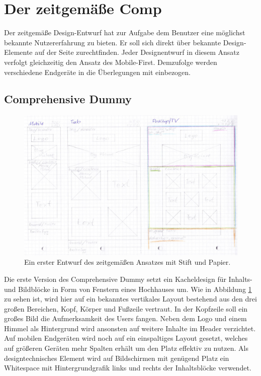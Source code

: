 \section{Der zeitgemäße Comp}
Der zeitgemäße Design-Entwurf hat zur Aufgabe dem Benutzer eine möglichst bekannte Nutzererfahrung zu bieten. Er soll sich direkt über bekannte Design-Elemente auf der Seite zurechtfinden. 
Jeder Designentwurf in diesem Ansatz verfolgt gleichzeitig den Ansatz des Mobile-First. Demzufolge werden verschiedene Endgeräte in die Überlegungen mit einbezogen.

\subsection{Comprehensive Dummy}
\begin{figure} [hp]
	\includegraphics[width=\textwidth]{./img/zeitg_comp1.jpg}
	\caption{Ein erster Entwurf des zeitgemäßen Ansatzes mit Stift und Papier.}
	\label{zeitg:Comp1}
\end{figure}

Die erste Version des Comprehensive Dummy setzt ein Kacheldesign für Inhalts- und Bildblöcke in Form von Fenstern eines Hochhauses um. Wie in Abbildung \ref{zeitg:Comp1} zu sehen ist, wird hier auf ein bekanntes vertikales Layout bestehend aus den drei großen Bereichen, Kopf, Körper und Fußzeile vertraut. In der Kopfzeile soll ein großes Bild die Aufmerksamkeit des Users fangen. Neben dem Logo und einem Himmel als Hintergrund wird ansonsten auf weitere Inhalte im Header verzichtet. Auf mobilen Endgeräten wird noch auf ein einspaltiges Layout gesetzt, welches auf größeren Geräten mehr Spalten erhält um den Platz effektiv zu nutzen. Als designtechnisches Element wird auf Bildschirmen mit genügend Platz ein Whitespace mit Hintergrundgrafik links und rechts der Inhaltsblöcke verwendet.

